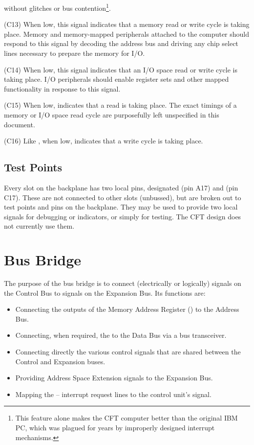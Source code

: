 \begin{description}
  without glitches or bus contention\footnote{This feature alone makes
    the CFT computer better than the original IBM PC, which was
    plagued for years by improperly designed interrupt mechanisms.}.
\item{\bfseries \MEM} (C13) When low, this signal indicates that a memory
  read or write cycle is taking place. Memory and memory-mapped
  peripherals attached to the computer should respond to this signal
  by decoding the address bus and driving any chip select lines
  necessary to prepare the memory for I/O.
\item{\bfseries \IO} (C14) When low, this signal indicates that an I/O space
  read or write cycle is taking place. I/O peripherals should enable
  register sets and other mapped functionality in response to this
  signal.
\item{\bfseries \READ} (C15) When low, indicates that a read is taking
  place. The exact timings of a memory or I/O space read cycle are
  purposefully left unspecified in this document.
\item{\bfseries \WRITE} (C16) Like \READ, when low, indicates that a write
  cycle is taking place.
\end{description}

\subsection{Test Points}

Every slot on the backplane has two local pins, designated \TPA{} (pin
A17) and \TPC{} (pin C17). These are not connected to other slots
(unbussed), but are broken out to test points and pins on the
backplane. They may be used to provide two local signals for debugging
or indicators, or simply for testing. The CFT design does not
currently use them.

\section{Bus Bridge}

The purpose of the bus bridge is to connect (electrically or
logically) signals on the Control Bus to signals on the Expansion
Bus. Its functions are:

\begin{itemize}
\item Connecting the outputs of the Memory Address Register (\MAR) to the Address Bus.
\item Connecting, when required, the \IBUS{} to the Data Bus via a bus transceiver.
\item Connecting directly the various control signals that are shared
  between the Control and Expansion buses.
\item Providing Address Space Extension signals to the Expansion Bus.
\item Mapping the – interrupt request lines to the
  control unit's \IRQ{} signal.
\end{itemize}

